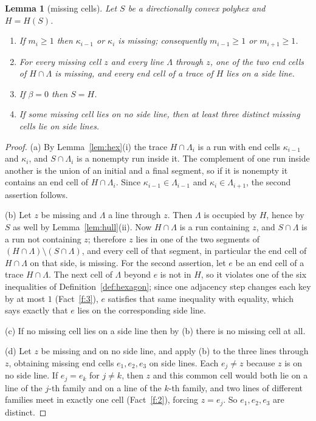 \documentclass[11pt]{article}
\theoremstyle{plain}
\newtheorem{lemma}[theorem]{Lemma}
\theoremstyle{definition}
\theoremstyle{remark}
\newcommand{\sm}{\setminus}
\begin{document}
\begin{lemma}[missing cells]\label{lem:missing}
Let \(S\) be a directionally convex polyhex and \(H=H(S)\).
\begin{enumerate}
\item[(a)] If \(m_{i}\ge1\) then \(\kappa_{i-1}\) or \(\kappa_{i}\) is missing; consequently
\(m_{i-1}\ge1\) or \(m_{i+1}\ge1\).
\item[(b)] For every missing cell \(z\) and every line \(\Lambda\) through \(z\), one of the
two end cells of \(H\cap\Lambda\) is missing, and every end cell of a trace of \(H\) lies
on a side line.
\item[(c)] If \(\beta=0\) then \(S=H\).
\item[(d)] If some missing cell lies on no side line, then at least three distinct missing
cells lie on side lines.
\end{enumerate}
\end{lemma}

\begin{proof}
(a) By Lemma~\ref{lem:hex}(i) the trace \(H\cap\Lambda_{i}\) is a run with end cells
\(\kappa_{i-1}\) and \(\kappa_{i}\), and \(S\cap\Lambda_{i}\) is a nonempty run inside it.
The complement of one run inside another is the union of an initial and a final segment, so
if it is nonempty it contains an end cell of \(H\cap\Lambda_{i}\). Since
\(\kappa_{i-1}\in\Lambda_{i-1}\) and \(\kappa_{i}\in\Lambda_{i+1}\), the second assertion
follows.

(b) Let \(z\) be missing and \(\Lambda\) a line through \(z\). Then \(\Lambda\) is occupied
by \(H\), hence by \(S\) as well by Lemma~\ref{lem:hull}(ii). Now \(H\cap\Lambda\) is a run
containing \(z\), and \(S\cap\Lambda\) is a run not containing \(z\); therefore \(z\) lies
in one of the two segments of \((H\cap\Lambda)\sm(S\cap\Lambda)\), and every cell of that
segment, in particular the end cell of \(H\cap\Lambda\) on that side, is missing. For the
second assertion, let \(e\) be an end cell of a trace \(H\cap\Lambda\). The next cell of
\(\Lambda\) beyond \(e\) is not in \(H\), so it violates one of the six inequalities of
Definition~\ref{def:hexagon}; since one adjacency step changes each key by at most \(1\)
(Fact~\ref{f:3}), \(e\) satisfies that same inequality with equality, which says exactly
that \(e\) lies on the corresponding side line.

(c) If no missing cell lies on a side line then by (b) there is no missing cell at all.

(d) Let \(z\) be missing and on no side line, and apply (b) to the three lines through
\(z\), obtaining missing end cells \(e_{1},e_{2},e_{3}\) on side lines. Each \(e_{j}\neq z\)
because \(z\) is on no side line. If \(e_{j}=e_{k}\) for \(j\neq k\), then \(z\) and this
common cell would both lie on a line of the \(j\)-th family and on a line of the \(k\)-th
family, and two lines of different families meet in exactly one cell (Fact~\ref{f:2}),
forcing \(z=e_{j}\). So \(e_{1},e_{2},e_{3}\) are distinct.
\end{proof}
\end{document}
